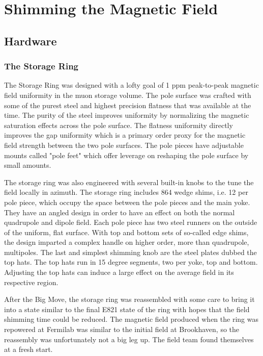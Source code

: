 \chapter {Shimming the Magnetic Field} \label{ch:shimming}

\section{Hardware}

\subsection{The Storage Ring}

The \gmtwo Storage Ring was designed with a lofty goal of 1 ppm peak-to-peak magnetic field uniformity in the muon storage volume.  The pole surface was crafted with some of the purest steel and highest precision flatness that was available at the time. The purity of the steel improves uniformity by normalizing the magnetic saturation effects across the pole surface.  The flatness uniformity directly improves the gap uniformity which is a primary order proxy for the magnetic field strength between the two pole surfaces. The pole pieces have adjustable mounts called "pole feet" which offer leverage on reshaping the pole surface by small amounts. 


The storage ring was also engineered with several built-in knobs to the tune the field locally in azimuth.  The storage ring includes 864 wedge shims, i.e. 12 per pole piece, which occupy the space between the pole pieces and the main yoke.  They have an angled design in order to have an effect on both the normal quadrupole and dipole field.  Each pole piece has two steel runners on the outside of the uniform, flat surface.  With top and bottom sets of so-called edge shims, the design imparted a complex handle on higher order, more than quadrupole, multipoles. The last and simplest shimming knob are the steel plates dubbed the top hats.  The top hats run in 15 degree segments, two per yoke, top and bottom.  Adjusting the top hats can induce a large effect on the average field in its respective region.  


After the Big Move, the storage ring was reassembled with some care to bring it into a state similar to the final E821 state of the ring with hopes that the field shimming time could be reduced.  The magnetic field produced when the ring was repowered at Fermilab was similar to the initial field at Brookhaven, so the reassembly was unfortunately not a big leg up.  The field team found themselves at a fresh start.

